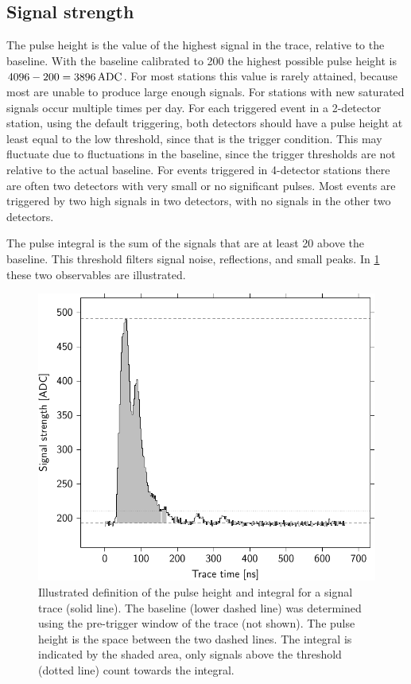 \subsection{Signal strength}

The pulse height is the value of the highest signal in the trace, relative to the baseline. With the baseline calibrated to \SI{200}{\adc} the highest possible pulse height is $4096 - 200 = \SI{3896}{\adc}$. For most stations this value is rarely attained, because most \pmts are unable to produce large enough signals. For stations with new \pmts saturated signals occur multiple times per day. For each triggered event in a 2-detector station, using the default triggering, both detectors should have a pulse height at least equal to the low threshold, since that is the trigger condition. This may fluctuate due to fluctuations in the baseline, since the trigger thresholds are not relative to the actual baseline. For events triggered in 4-detector stations there are often two detectors with very small or no significant pulses. Most events are triggered by two high signals in two detectors, with no signals in the other two detectors.

The pulse integral is the sum of the signals that are at least \SI{20}{\adc} above the baseline. This threshold filters signal noise, reflections, and small peaks. In \cref{fig:integral} these two observables are illustrated.

\begin{figure}
    \centering
    \includegraphics[width=0.7\linewidth]{plots/processing/integral}
    \caption{Illustrated definition of the pulse height and integral for a signal trace (solid line). The baseline (lower dashed line) was determined using the pre-trigger window of the trace (not shown). The pulse height is the space between the two dashed lines. The integral is indicated by the shaded area, only signals above the threshold (dotted line) count towards the integral.}
    \label{fig:integral}
\end{figure}


